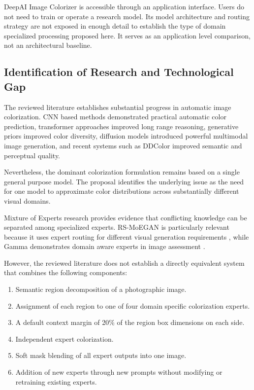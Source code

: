 \documentclass{FastFyp}
\begin{document}
DeepAI Image Colorizer is accessible through an application interface. Users do not need to train or operate a research model. Its model architecture and routing strategy are not exposed in enough detail to establish the type of domain specialized processing proposed here. It serves as an application level comparison, not an architectural baseline.


\subsection{Identification of Research and Technological Gap}

The reviewed literature establishes substantial progress in automatic image colorization. CNN based methods demonstrated practical automatic color prediction, transformer approaches improved long range reasoning, generative priors improved color diversity, diffusion models introduced powerful multimodal image generation, and recent systems such as DDColor improved semantic and perceptual quality.

Nevertheless, the dominant colorization formulation remains based on a single general purpose model. The proposal identifies the underlying issue as the need for one model to approximate color distributions across substantially different visual domains.

Mixture of Experts research provides evidence that conflicting knowledge can be separated among specialized experts. RS-MoEGAN is particularly relevant because it uses expert routing for different visual generation requirements \cite{ref16}, while Gamma demonstrates domain aware experts in image assessment \cite{ref15}.

However, the reviewed literature does not establish a directly equivalent system that combines the following components:

\begin{enumerate}
    \item Semantic region decomposition of a photographic image.
    
    \item Assignment of each region to one of four domain specific colorization experts.
    
    \item A default context margin of 20\% of the region box dimensions on each side.
    
    \item Independent expert colorization.
    
    \item Soft mask blending of all expert outputs into one image.
    
    \item Addition of new experts through new prompts without modifying or retraining existing experts.
\end{enumerate}
\end{document}
